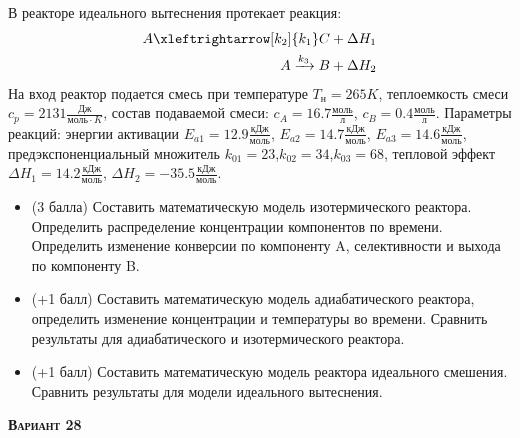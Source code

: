 В реакторе идеального вытеснения протекает реакция: \begin{equation*} \begin{aligned} A \xleftrightarrow[k_2]{k_1} C + \Delta H_1 \\ A \xrightarrow{k_3} B + \Delta H_2 \end{aligned} \end{equation*}                                      На вход  реактор подается смесь при температуре $ T_н =  265 K$, теплоемкость смеси $c_p= 2131 \frac{Дж}{моль \cdot K}$, состав подаваемой смеси: $c_A=16.7 \frac{моль}{л}$, $c_B=0.4 \frac{моль}{л}$. Параметры реакций: энергии активации $E_{a1}=12.9 \frac{кДж}{моль}$, $E_{a2}=14.7  \frac{кДж}{моль}$, $E_{a3}=14.6  \frac{кДж}{моль}$, предэкспоненциальный множитель $k_{01}=        23$,$k_{02}=        34$,$k_{03}=        68$, тепловой эффект $\Delta H_1= 14.2  \frac{кДж}{моль}$, $\Delta H_2=-35.5 \frac{кДж}{моль}$.\begin{itemize} \item (3 балла) Составить математическую модель изотермического реактора. Определить распределение концентрации компонентов по времени. Определить изменение конверсии по компоненту A, селективности и выхода по компоненту B. \item (+1 балл) Составить математическую модель адиабатического реактора, определить изменение концентрации и температуры во времени. Сравнить результаты для адиабатического и изотермического реактора. \item (+1 балл) Составить математическую модель реактора идеального смешения. Сравнить результаты для модели идеального вытеснения. \end{itemize}

\textsc{\textbf{Вариант 28}}

